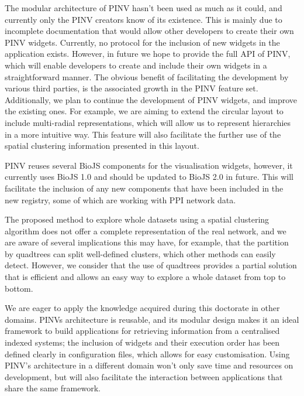 The modular architecture of PINV hasn't been used as much as it could, and currently only the PINV creators know of its existence. This is mainly due to incomplete documentation that would allow other developers to create their own PINV widgets. Currently, no protocol for the inclusion of new widgets in the application exists. However, in future we hope to provide the full API of PINV, which will enable developers to create and include their own widgets in a straightforward manner.  The obvious benefit of facilitating the development by various third parties, is the associated growth in the PINV feature set. Additionally, we plan to continue the development of PINV widgets, and improve the existing ones.  For example, we are aiming to extend the circular layout to include multi-radial representations, which will allow us to represent hierarchies in a more intuitive way. This feature will also facilitate the further use of the spatial clustering information presented in this layout.

PINV reuses several BioJS components for the visualisation widgets, however, it currently uses BioJS 1.0 and should be updated to BioJS 2.0 in future. This will facilitate the inclusion of any new components that have been included in the new registry, some of which are working with PPI network data.

The proposed method to explore whole datasets using a spatial clustering algorithm does not offer a complete representation of the real network, and we are aware of several implications this may have, for example, that the partition by quadtrees can split well-defined clusters, which other methods can easily detect. However, we consider that the use of quadtrees provides a partial solution that is efficient and allows an easy way to explore a whole dataset from top to bottom.

We are eager to apply the knowledge acquired during this doctorate in other domains. PINVs architecture is reusable, and its modular design makes it an ideal framework to build applications for retrieving information from a centralised indexed systems; the inclusion of widgets and their execution order has been defined clearly in configuration files, which allows for easy customisation. Using PINV's architecture in a different domain won't only save time and resources on development, but will also facilitate the interaction between applications that share the same framework.

\vspace{5mm}

